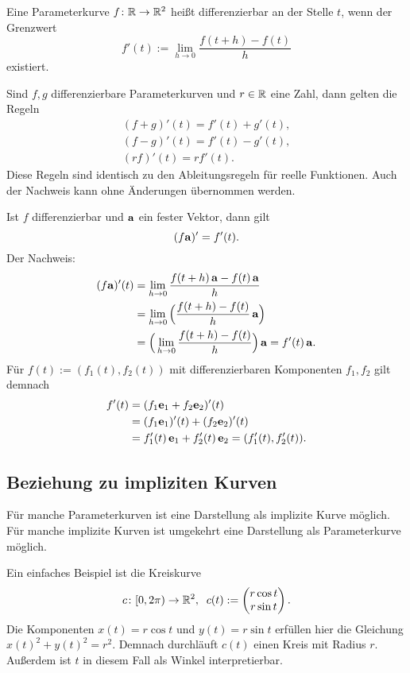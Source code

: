  Eine Parameterkurve $f\colon\mathbb R\to\mathbb R^2$ heißt
differenzierbar an der Stelle $t$, wenn der Grenzwert%
\begin{equation}
f'(t) := \lim_{h\to 0}\frac{f(t+h)-f(t)}{h}
\end{equation}
existiert.

Sind $f,g$ differenzierbare Parameterkurven und $r\in\mathbb R$ eine Zahl,
dann gelten die Regeln%
\begin{gather}
(f+g)'(t) = f'(t)+g'(t),\\
(f-g)'(t) = f'(t)-g'(t),\\
(rf)'(t) = rf'(t).
\end{gather}
Diese Regeln sind identisch zu den Ableitungsregeln für reelle
Funktionen. Auch der Nachweis kann ohne Änderungen übernommen
werden.

Ist $f$ differenzierbar und $\mathbf{a}$ ein fester Vektor, dann gilt%
\begin{equation}
(f\mathbf{a})' = f'(t).
\end{equation}
Der Nachweis:
\begin{align*}
(f\mathbf{a})'(t) &= \lim_{h\to 0}\frac{f(t+h)\,\mathbf{a}-f(t)\,\mathbf{a}}{h}\\
&= \lim_{h\to 0}\Big(\frac{f(t+h)-f(t)}{h}\,\mathbf{a}\Big)\\
&= \Big(\lim_{h\to 0}\frac{f(t+h)-f(t)}{h}\Big)\,\mathbf{a}
= f'(t)\,\mathbf{a}.
\end{align*}
Für $f(t):=(f_1(t),f_2(t))$ mit differenzierbaren Komponenten
$f_1,f_2$ gilt demnach
\begin{align*}
f'(t) &= (f_1\mathbf{e}_1+f_2\mathbf{e}_2)'(t)\\
&= (f_1\mathbf{e}_1)'(t)+(f_2\mathbf{e}_2)'(t)\\
&= f_1'(t)\,\mathbf{e}_1+f_2'(t)\,\mathbf{e}_2 = (f_1'(t),f_2'(t)).
\end{align*}

\subsection{Beziehung zu impliziten Kurven}

Für manche Parameterkurven ist eine Darstellung als implizite
Kurve möglich. Für manche implizite Kurven ist umgekehrt eine
Darstellung als Parameterkurve möglich.

Ein einfaches Beispiel ist die Kreiskurve
\begin{equation}
c\colon{[0,2\pi)}\to\mathbb R^2,\;\;c(t):=\begin{pmatrix}
r\cos t\\
r\sin t
\end{pmatrix}.
\end{equation}
Die Komponenten $x(t)=r\cos t$  und $y(t)=r\sin t$ erfüllen hier die
Gleichung $x(t)^2+y(t)^2=r^2$. Demnach durchläuft $c(t)$ einen
Kreis mit Radius $r$. Außerdem ist $t$ in diesem Fall als Winkel
interpretierbar.

